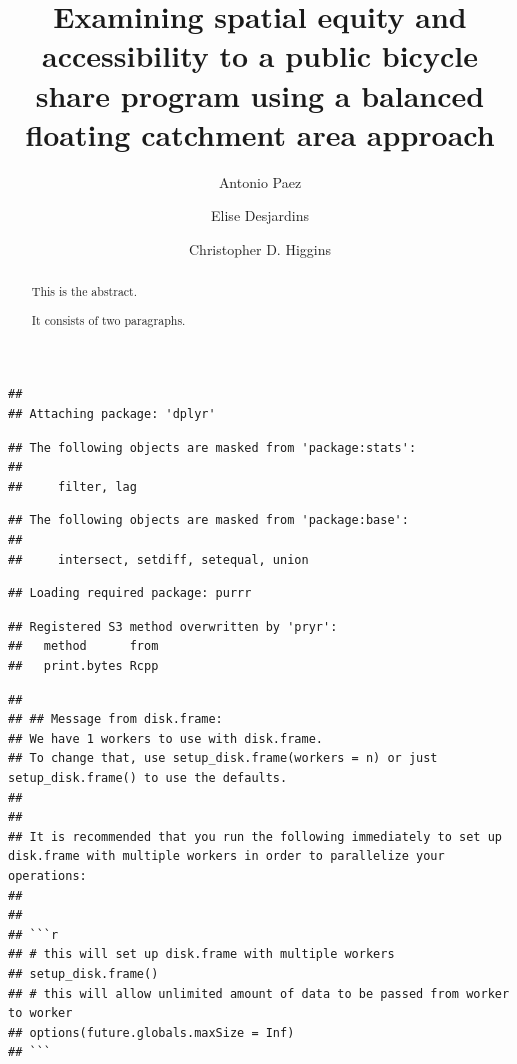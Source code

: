 \documentclass[]{elsarticle} %
\begin{document}
\begin{frontmatter}

  \title{Examining spatial equity and accessibility to a public bicycle share
program using a balanced floating catchment area approach}
    \author[Some School]{Antonio Paez}
    \author[Some School]{Elise Desjardins}
    \author[Another University]{Christopher D. Higgins}
      \address[McMaster University]{School of Earth, Environment \& Society, 1280 Main Street West,
Hamilton, ON}
    \address[University of Toronto Scarborough]{Department, Street, City, State, Zip}
  
  \begin{abstract}
  This is the abstract.
  
  It consists of two paragraphs.
  \end{abstract}
  
 \end{frontmatter}

\begin{verbatim}
## 
## Attaching package: 'dplyr'
\end{verbatim}

\begin{verbatim}
## The following objects are masked from 'package:stats':
## 
##     filter, lag
\end{verbatim}

\begin{verbatim}
## The following objects are masked from 'package:base':
## 
##     intersect, setdiff, setequal, union
\end{verbatim}

\begin{verbatim}
## Loading required package: purrr
\end{verbatim}

\begin{verbatim}
## Registered S3 method overwritten by 'pryr':
##   method      from
##   print.bytes Rcpp
\end{verbatim}

\begin{verbatim}
## 
## ## Message from disk.frame:
## We have 1 workers to use with disk.frame.
## To change that, use setup_disk.frame(workers = n) or just setup_disk.frame() to use the defaults.
## 
## 
## It is recommended that you run the following immediately to set up disk.frame with multiple workers in order to parallelize your operations:
## 
## 
## ```r
## # this will set up disk.frame with multiple workers
## setup_disk.frame()
## # this will allow unlimited amount of data to be passed from worker to worker
## options(future.globals.maxSize = Inf)
## ```
\end{verbatim}
\end{document}
